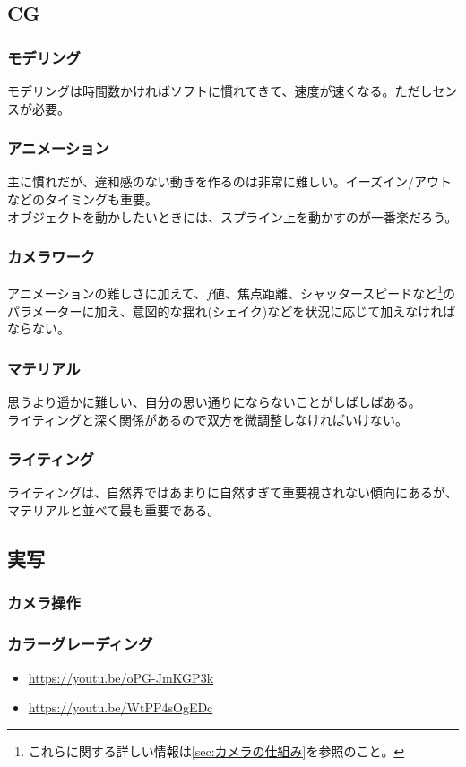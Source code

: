 \documentclass[dvipdfmx,jb5]{jreport}
\begin{document}
\subsection{CG}
\subsubsection{モデリング}
モデリングは時間数かければソフトに慣れてきて、速度が速くなる。ただしセンスが必要。
\subsubsection{アニメーション}
主に慣れだが、違和感のない動きを作るのは非常に難しい。イーズイン/アウトなどのタイミングも重要。\\
オブジェクトを動かしたいときには、スプライン上を動かすのが一番楽だろう。
\subsubsection{カメラワーク}
アニメーションの難しさに加えて、$f値$、焦点距離、シャッタースピードなど\footnote{これらに関する詳しい情報は\ref{sec:カメラの仕組み}を参照のこと。}のパラメーターに加え、意図的な揺れ(シェイク)などを状況に応じて加えなければならない。
\subsubsection{マテリアル}
思うより遥かに難しい、自分の思い通りにならないことがしばしばある。\\
ライティングと深く関係があるので双方を微調整しなければいけない。
\subsubsection{ライティング}
ライティングは、自然界ではあまりに自然すぎて重要視されない傾向にあるが、マテリアルと並べて最も重要である。
\subsection{実写}
\subsubsection{カメラ操作}
\subsubsection{カラーグレーディング}
\begin{itemize}
      \item \url{https://youtu.be/oPG-JmKGP3k}
      \item \url{https://youtu.be/WtPP4sOgEDc}
\end{itemize}
\end{document}
